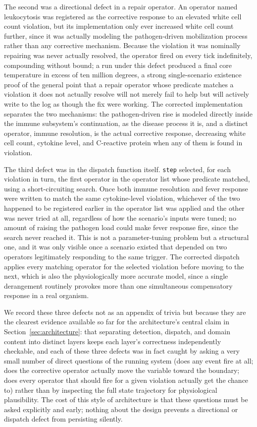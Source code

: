 \documentclass[11pt]{article}
\begin{document}
The second was a directional defect in a repair operator. An operator named leukocytosis was registered as the corrective response to an elevated white cell count violation, but its implementation only ever increased white cell count further, since it was actually modeling the pathogen-driven mobilization process rather than any corrective mechanism. Because the violation it was nominally repairing was never actually resolved, the operator fired on every tick indefinitely, compounding without bound; a run under this defect produced a final core temperature in excess of ten million degrees, a strong single-scenario existence proof of the general point that a repair operator whose predicate matches a violation it does not actually resolve will not merely fail to help but will actively write to the log as though the fix were working. The corrected implementation separates the two mechanisms: the pathogen-driven rise is modeled directly inside the immune subsystem's continuation, as the disease process it is, and a distinct operator, immune resolution, is the actual corrective response, decreasing white cell count, cytokine level, and C-reactive protein when any of them is found in violation.

The third defect was in the dispatch function itself. \texttt{step} selected, for each violation in turn, the first operator in the operator list whose predicate matched, using a short-circuiting search. Once both immune resolution and fever response were written to match the same cytokine-level violation, whichever of the two happened to be registered earlier in the operator list was applied and the other was never tried at all, regardless of how the scenario's inputs were tuned; no amount of raising the pathogen load could make fever response fire, since the search never reached it. This is not a parameter-tuning problem but a structural one, and it was only visible once a scenario existed that depended on two operators legitimately responding to the same trigger. The corrected dispatch applies every matching operator for the selected violation before moving to the next, which is also the physiologically more accurate model, since a single derangement routinely provokes more than one simultaneous compensatory response in a real organism.

We record these three defects not as an appendix of trivia but because they are the clearest evidence available so far for the architecture's central claim in Section~\ref{sec:architecture}: that separating detection, dispatch, and domain content into distinct layers keeps each layer's correctness independently checkable, and each of these three defects was in fact caught by asking a very small number of direct questions of the running system (does any event fire at all; does the corrective operator actually move the variable toward the boundary; does every operator that should fire for a given violation actually get the chance to) rather than by inspecting the full state trajectory for physiological plausibility. The cost of this style of architecture is that these questions must be asked explicitly and early; nothing about the design prevents a directional or dispatch defect from persisting silently.
\end{document}
